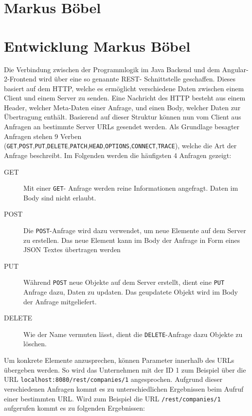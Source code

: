\section[Rest-Schnittstelle]{Markus Böbel}
\section[(Autor) Titel]{Entwicklung \textnormal{\textsf{\small{Markus Böbel}}}}

Die Verbindung zwischen der Programmlogik im Java Backend und dem Angular-2-Frontend wird über eine so genannte \acf{REST}- Schnittstelle geschaffen. Dieses basiert auf dem \acf{HTTP}, welche es ermöglicht verschiedene Daten zwischen einem Client und einem Server zu senden.
Eine Nachricht des \acl{HTTP} besteht aus einem Header, welcher Meta-Daten einer Anfrage, und einen Body, welcher Daten zur Übertragung enthält.
Basierend auf dieser Struktur können nun vom Client aus Anfragen an bestimmte Server URLs gesendet werden. Als Grundlage besagter Anfragen stehen 9 Verben (\texttt{GET},\texttt{POST},\texttt{PUT},\texttt{DELETE},\texttt{PATCH},\texttt{HEAD},\texttt{OPTIONS},\texttt{CONNECT},\texttt{TRACE}), welche die Art der Anfrage beschreibt. Im Folgenden werden die häufigsten 4 Anfragen gezeigt:

\begin{description} 
	\item  [GET] {Mit einer \texttt{GET}- Anfrage werden reine Informationen angefragt. Daten im Body sind nicht erlaubt.}
	\item [POST]{Die \texttt{POST}-Anfrage wird dazu verwendet, um neue Elemente auf dem Server zu erstellen. Das neue Element kann im Body der Anfrage in Form eines JSON Textes übertragen werden}
	\item [PUT]{Während \texttt{POST} neue Objekte auf dem Server erstellt, dient eine \texttt{PUT} Anfrage dazu, Daten zu updaten. Das geupdatete Objekt wird im Body der Anfrage mitgeliefert}.
	\item[DELETE] {Wie der Name vermuten lässt, dient die \texttt{DELETE}-Anfrage dazu Objekte zu löschen}.
	
\end{description}

Um konkrete Elemente anzusprechen, können Parameter innerhalb des URLs übergeben werden. So wird das Unternehmen mit der ID 1 zum Beispiel über die URL 
\texttt{localhost:8080/rest/companies/1} angesprochen.
Aufgrund dieser verschiedenen Anfragen kommt es zu unterschiedlichen Ergebnissen beim Aufruf einer bestimmten URL. Wird zum Beispiel die URL \texttt{/rest/companies/1} aufgerufen kommt es zu folgenden Ergebnissen:

